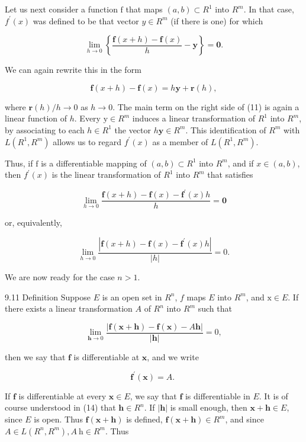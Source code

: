\documentclass[10pt]{article}
\begin{document}
Let us next consider a function $\mathrm{f}$ that maps $(a, b) \subset R^{1}$ into $R^{m}$. In that case, $f^{\prime}(x)$ was defined to be that vector $y \in R^{m}$ (if there is one) for which

$$
\lim _{h \rightarrow 0}\left\{\frac{\mathbf{f}(x+h)-\mathbf{f}(x)}{h}-\mathbf{y}\right\}=\mathbf{0} .
$$

We can again rewrite this in the form

$$
\mathbf{f}(x+h)-\mathbf{f}(x)=h \mathbf{y}+\mathbf{r}(h),
$$

where $\mathbf{r}(h) / h \rightarrow 0$ as $h \rightarrow 0$. The main term on the right side of (11) is again a linear function of $h$. Every $\mathrm{y} \in R^{m}$ induces a linear transformation of $R^{1}$ into $R^{m}$, by associating to each $h \in R^{1}$ the vector $h \mathbf{y} \in R^{m}$. This identification of $R^{m}$ with $L\left(R^{1}, R^{m}\right)$ allows us to regard $f^{\prime}(x)$ as a member of $L\left(R^{1}, R^{m}\right)$.

Thus, if $\mathrm{f}$ is a differentiable mapping of $(a, b) \subset R^{1}$ into $R^{m}$, and if $x \in(a, b)$, then $f^{\prime}(x)$ is the linear transformation of $R^{1}$ into $R^{m}$ that satisfies

$$
\lim _{h \rightarrow 0} \frac{\mathbf{f}(x+h)-\mathbf{f}(x)-\mathbf{f}^{\prime}(x) h}{h}=\mathbf{0}
$$

or, equivalently,

$$
\lim _{h \rightarrow 0} \frac{\left|\mathbf{f}(x+h)-\mathbf{f}(x)-\mathbf{f}^{\prime}(x) h\right|}{|h|}=0 .
$$

We are now ready for the case $n>1$.

9.11 Definition Suppose $E$ is an open set in $R^{n}$, $f$ maps $E$ into $R^{m}$, and $\mathrm{x} \in E$. If there exists a linear transformation $A$ of $R^{n}$ into $R^{m}$ such that

$$
\lim _{\mathbf{h} \rightarrow 0} \frac{|\mathbf{f}(\mathbf{x}+\mathbf{h})-\mathbf{f}(\mathbf{x})-A \mathbf{h}|}{|\mathbf{h}|}=0,
$$

then we say that $\mathbf{f}$ is differentiable at $\mathbf{x}$, and we write

$$
\mathbf{f}^{\prime}(\mathbf{x})=A \text {. }
$$

If $\mathbf{f}$ is differentiable at every $\mathbf{x} \in E$, we say that $\mathbf{f}$ is differentiable in $E$. It is of course understood in (14) that $\mathbf{h} \in R^{n}$. If $|\mathbf{h}|$ is small enough, then $\mathbf{x}+\mathbf{h} \in E$, since $E$ is open. Thus $\mathbf{f}(\mathbf{x}+\mathbf{h})$ is defined, $\mathbf{f}(\mathbf{x}+\mathbf{h}) \in R^{m}$, and since $A \in L\left(R^{n}, R^{m}\right), A \mathrm{~h} \in R^{m}$. Thus
\end{document}
